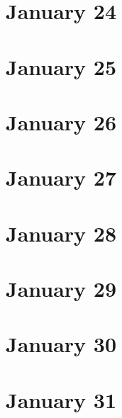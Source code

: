 \section{January 24}

\section{January 25}

\section{January 26}

\section{January 27}

\section{January 28}

\section{January 29}

\section{January 30}

\section{January 31}




